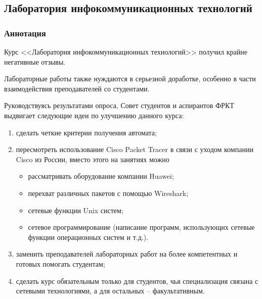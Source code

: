 \subsection{Лаборатория инфокоммуникационных технологий}
	
	\subsubsection{Аннотация}

        Курс <<Лаборатория инфокоммуникационных технологий>> получил крайне негативные отзывы. 
                
        Лабораторные работы также нуждаются в серьезной доработке, особенно в части взаимодействия преподавателей со студентами.

        Руководствуясь результатами опроса, Совет студентов и аспирантов ФРКТ выдвигает следующие идеи по улучшению данного курса:
        \begin{enumerate}
            \item сделать четкие критерии получения автомата;
            \item пересмотреть использование Cisco Packet Tracer в связи с уходом компании Cisco из России, вместо этого на занятиях можно
                \begin{itemize}
                    \item рассматривать оборудование компании Huawei;
                    \item перехват различных пакетов с помощью Wireshark;
                    \item сетевые функции Unix систем;
                    \item сетевое программирование (написание программ, использующих сетевые функции операционных систем и т.д.).
                \end{itemize}
            \item заменить преподавателей лабораторных работ на более компетентных и готовых помогать студентам;
            \item сделать курс обязательным только для студентов, чья специализация связана с сетевыми технологиями, а для остальных -- факультативным.
        \end{enumerate}
       


